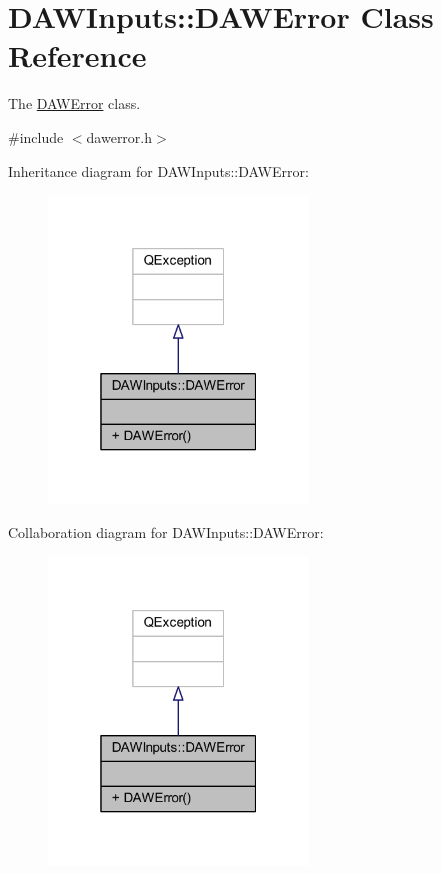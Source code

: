 \hypertarget{class_d_a_w_inputs_1_1_d_a_w_error}{\section{D\-A\-W\-Inputs\-:\-:D\-A\-W\-Error Class Reference}
\label{class_d_a_w_inputs_1_1_d_a_w_error}
}


The \hyperlink{class_d_a_w_inputs_1_1_d_a_w_error}{D\-A\-W\-Error} class.  




{\ttfamily \#include $<$dawerror.\-h$>$}



Inheritance diagram for D\-A\-W\-Inputs\-:\-:D\-A\-W\-Error\-:
\nopagebreak
\begin{figure}[H]
\begin{center}
\leavevmode
\includegraphics[width=196pt]{class_d_a_w_inputs_1_1_d_a_w_error__inherit__graph}
\end{center}
\end{figure}


Collaboration diagram for D\-A\-W\-Inputs\-:\-:D\-A\-W\-Error\-:
\nopagebreak
\begin{figure}[H]
\begin{center}
\leavevmode
\includegraphics[width=196pt]{class_d_a_w_inputs_1_1_d_a_w_error__coll__graph}
\end{center}
\end{figure}


